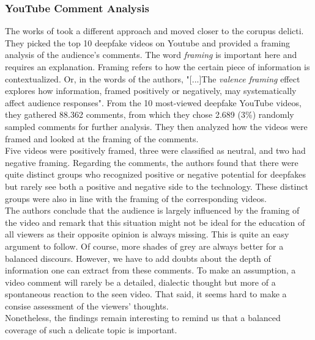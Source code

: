 \documentclass[
  a4paper,  %
  twoside,  %
  bibliography=totoc,
  headsepline,
  cleardoublepage=empty,
  parskip=half,
  draft=false
]{scrbook}
\begin{document}
\subsubsection*{YouTube Comment Analysis}
The works of \citeauthor{leeBelieveNotBelieve2021} took a different approach and moved closer to the corupus delicti. They picked the top 10 deepfake videos on Youtube and provided a framing analysis of the audience's comments. The word \textit{framing} is important here and requires an explanation. Framing refers to how the certain piece of information is contextualized. Or, in the words of the authors, "[...]The \textit{valence framing} effect explores how information, framed positively or negatively, may systematically affect audience responses". From the 10 most-viewed deepfake YouTube videos, they gathered 88.362 comments, from which they chose 2.689 (3\%) randomly sampled comments for further analysis. They then analyzed how the videos were framed and looked at the framing of the comments.\\
Five videos were positively framed, three were classified as neutral, and two had negative framing. Regarding the comments, the authors found that there were quite distinct groups who recognized positive or negative potential for deepfakes but rarely see both a positive and negative side to the technology. These distinct groups were also in line with the framing of the corresponding videos. \\
The authors conclude that the audience is largely influenced by the framing of the video and remark that this situation might not be ideal for the education of all viewers as their opposite opinion is always missing. This is quite an easy argument to follow. Of course, more shades of grey are always better for a balanced discours. However, we have to add doubts about the depth of information one can extract from these comments. To make an assumption, a video comment will rarely be a detailed, dialectic thought but more of a spontaneous reaction to the seen video. That said, it seems hard to make a consise assessment of the viewers' thoughts. \\
Nonetheless, the findings remain interesting to remind us that a balanced coverage of such a delicate topic is important.
\end{document}
